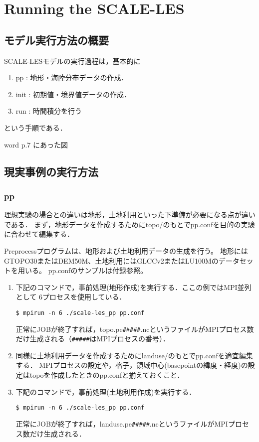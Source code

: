 \section{Running the SCALE-LES}

\subsection{モデル実行方法の概要}
SCALE-LESモデルの実行過程は，基本的に
\begin{enumerate}
\item pp : 地形・海陸分布データの作成．
\item init : 初期値・境界値データの作成．
\item run : 時間積分を行う
\end{enumerate}
という手順である．

{\Huge word p.7 にあった図}



\subsection{現実事例の実行方法}
\subsubsection{pp}
理想実験の場合との違いは地形，土地利用といった下準備が必要になる点が違いである．
まず，地形データを作成するためにtopo/のもとでpp.confを目的の実験に合わせて編集する．

Preprocessプログラムは、地形および土地利用データの生成を行う。
地形にはGTOPO30またはDEM50M、土地利用にはGLCCv2またはLU100Mのデータセットを用いる。
pp.confのサンプルは付録参照。

\begin{enumerate}
\item 下記のコマンドで，事前処理(地形作成)を実行する．ここの例ではMPI並列として
6プロセスを使用している．
\begin{verbatim}
$ mpirun -n 6 ./scale-les_pp pp.conf
\end{verbatim}
正常にJOBが終了すれば，topo.pe\verb|#####|.ncというファイルがMPIプロセス数だけ生成される（\verb|#####|はMPIプロセスの番号）．

\item 同様に土地利用データを作成するためにlanduse/のもとでpp.confを適宜編集する．
MPIプロセスの設定や，格子，領域中心(basepointの緯度・経度)の設定はtopoを作成したときのpp.confと揃えておくこと．

\item 下記のコマンドで，事前処理(土地利用作成)を実行する．
\begin{verbatim}
$ mpirun -n 6 ./scale-les_pp pp.conf
\end{verbatim}
正常にJOBが終了すれば，landuse.pe\verb|#####|.ncというファイルがMPIプロセス数だけ生成される．
\end{enumerate}



